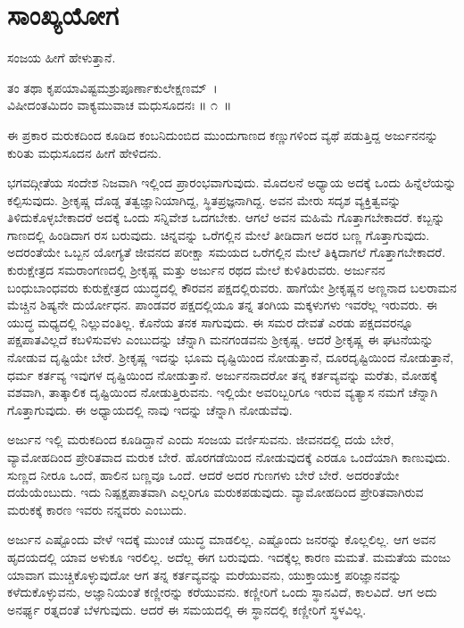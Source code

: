 
\chapter{ಸಾಂಖ್ಯಯೋಗ}

ಸಂಜಯ ಹೀಗೆ ಹೇಳುತ್ತಾನೆ.

\begin{shloka}
ತಂ ತಥಾ ಕೃಪಯಾವಿಷ್ಟಮಶ್ರುಪೂರ್ಣಾಕುಲೇಕ್ಷಣಮ್~।\\ವಿಷೀದಂತಮಿದಂ ವಾಕ್ಯಮುವಾಚ ಮಧುಸೂದನಃ \hfill॥ ೧~॥
\end{shloka}

\begin{artha}
ಈ ಪ್ರಕಾರ ಮರುಕದಿಂದ ಕೂಡಿದ ಕಂಬನಿದುಂಬಿದ ಮುಂದುಗಾಣದ ಕಣ್ಣುಗಳಿಂದ ವ್ಯಥೆ ಪಡುತ್ತಿದ್ದ ಅರ್ಜುನನನ್ನು ಕುರಿತು ಮಧುಸೂದನ ಹೀಗೆ ಹೇಳಿದನು.
\end{artha}

ಭಗವದ್ಗೀತೆಯ ಸಂದೇಶ ನಿಜವಾಗಿ ಇಲ್ಲಿಂದ ಪ್ರಾರಂಭವಾಗುವುದು. ಮೊದಲನೆ ಅಧ್ಯಾಯ ಅದಕ್ಕೆ ಒಂದು ಹಿನ್ನೆಲೆಯನ್ನು ಕಲ್ಪಿಸುವುದು. ಶ‍್ರೀಕೃಷ್ಣ ದೊಡ್ಡ ತತ್ವಜ್ಞಾನಿಯಾಗಿದ್ದ, ಸ್ಥಿತಪ್ರಜ್ಞ\-ನಾಗಿದ್ದ. ಅವನ ಮೇರು ಸದೃಶ ವ್ಯಕ್ತಿತ್ವವನ್ನು ತಿಳಿದುಕೊಳ್ಳಬೇಕಾದರೆ ಅದಕ್ಕೆ ಒಂದು ಸನ್ನಿವೇಶ ಒದಗಬೇಕು. ಆಗಲೆ ಅವನ ಮಹಿಮೆ ಗೊತ್ತಾಗಬೇಕಾದರೆ. ಕಬ್ಬನ್ನು ಗಾಣದಲ್ಲಿ ಹಿಂಡಿದಾಗ ರಸ ಬರುವುದು. ಚಿನ್ನವನ್ನು ಒರೆಗಲ್ಲಿನ ಮೇಲೆ ತೀಡಿದಾಗ ಅದರ ಬಣ್ಣ ಗೊತ್ತಾಗುವುದು. ಅದರಂತೆಯೇ ಒಬ್ಬನ ಯೋಗ್ಯತೆ ಜೀವನದ ಪರೀಕ್ಷಾ ಸಮಯದ ಒರೆಗಲ್ಲಿನ ಮೇಲೆ ತಿಕ್ಕಿದಾಗಲೆ ಗೊತ್ತಾಗಬೇಕಾದರೆ. ಕುರುಕ್ಷೇತ್ರದ ಸಮರಾಂಗಣದಲ್ಲಿ ಶ‍್ರೀಕೃಷ್ಣ ಮತ್ತು ಅರ್ಜುನ ರಥದ ಮೇಲೆ ಕುಳಿತಿರುವರು. ಅರ್ಜುನನ ಬಂಧುಬಾಂಧವರು ಕುರುಕ್ಷೇತ್ರದ ಯುದ್ಧದಲ್ಲಿ ಕೌರವನ ಪಕ್ಷದಲ್ಲಿರುವರು. ಹಾಗೆಯೇ ಶ‍್ರೀಕೃಷ್ಣನ ಅಣ್ಣನಾದ ಬಲರಾಮನ ಮೆಚ್ಚಿನ ಶಿಷ್ಯನೇ ದುರ್ಯೋಧನ. ಪಾಂಡವರ ಪಕ್ಷದಲ್ಲಿಯೂ ತನ್ನ ತಂಗಿಯ ಮಕ್ಕಳುಗಳು ಇವರೆಲ್ಲ ಇರುವರು. ಈ ಯುದ್ಧ ಮಧ್ಯದಲ್ಲಿ ನಿಲ್ಲುವಂತಿಲ್ಲ. ಕೊನೆಯ ತನಕ ಸಾಗುವುದು. ಈ ಸಮರ ದೇವತೆ ಎರಡು ಪಕ್ಷದವರನ್ನೂ ಪಕ್ಷಪಾತವಿಲ್ಲದೆ ಕಬಳಿಸುವಳು ಎಂಬುದನ್ನು ಚೆನ್ನಾಗಿ ಮನಗಂಡವನು ಶ‍್ರೀಕೃಷ್ಣ. ಆದರೆ ಶ‍್ರೀಕೃಷ್ಣ ಈ ಘಟನೆಯನ್ನು ನೋಡುವ ದೃಷ್ಟಿಯೇ ಬೇರೆ. ಶ‍್ರೀಕೃಷ್ಣ ಇದನ್ನು ಭೂಮ ದೃಷ್ಟಿಯಿಂದ ನೋಡುತ್ತಾನೆ, ದೂರದೃಷ್ಟಿಯಿಂದ ನೋಡುತ್ತಾನೆ, ಧರ್ಮ ಕರ್ತವ್ಯ ಇವುಗಳ ದೃಷ್ಟಿಯಿಂದ ನೋಡುತ್ತಾನೆ. ಅರ್ಜುನನಾದರೋ ತನ್ನ ಕರ್ತವ್ಯವನ್ನು ಮರೆತು, ಮೋಹಕ್ಕೆ ವಶವಾಗಿ, ತಾತ್ಕಾಲಿಕ ದೃಷ್ಟಿಯಿಂದ ನೋಡುತ್ತಿರುವನು. ಇಲ್ಲಿಯೇ ಅವರಿಬ್ಬರಿಗೂ ಇರುವ ವ್ಯತ್ಯಾಸ ನಮಗೆ ಚೆನ್ನಾಗಿ ಗೊತ್ತಾಗುವುದು. ಈ ಅಧ್ಯಾಯದಲ್ಲಿ ನಾವು ಇದನ್ನು ಚೆನ್ನಾಗಿ ನೋಡುವೆವು.

ಅರ್ಜುನ ಇಲ್ಲಿ ಮರುಕದಿಂದ ಕೂಡಿದ್ದಾನೆ ಎಂದು ಸಂಜಯ ವರ್ಣಿಸುವನು. ಜೀವನದಲ್ಲಿ ದಯೆ ಬೇರೆ, ವ್ಯಾಮೋಹದಿಂದ ಪ್ರೇರಿತವಾದ ಮರುಕ ಬೇರೆ. ಹೊರಗಡೆಯಿಂದ ನೋಡುವುದಕ್ಕೆ ಎರಡೂ ಒಂದೆಯಾಗಿ ಕಾಣುವುದು. ಸುಣ್ಣದ ನೀರೂ ಒಂದೆ, ಹಾಲಿನ ಬಣ್ಣವೂ ಒಂದೆ. ಆದರೆ ಅದರ ಗುಣಗಳು ಬೇರೆ ಬೇರೆ. ಅದರಂತೆಯೇ ದಯೆಯೆಂಬುದು. ಇದು ನಿಷ್ಪಕ್ಷಪಾತವಾಗಿ ಎಲ್ಲರಿಗೂ ಮರುಕಪಡುವುದು. ವ್ಯಾಮೋಹದಿಂದ ಪ್ರೇರಿತವಾಗಿರುವ ಮರುಕಕ್ಕೆ ಕಾರಣ ಇವರು ನನ್ನವರು ಎಂಬುದು.

ಅರ್ಜುನ ಎಷ್ಟೊಂದು ವೇಳೆ ಇದಕ್ಕೆ ಮುಂಚೆ ಯುದ್ಧ ಮಾಡಲಿಲ್ಲ. ಎಷ್ಟೊಂದು ಜನರನ್ನು ಕೊಲ್ಲಲಿಲ್ಲ. ಆಗ ಅವನ ಹೃದಯದಲ್ಲಿ ಯಾವ ಅಳುಕೂ ಇರಲಿಲ್ಲ. ಅದೆಲ್ಲ ಈಗ ಬರುವುದು. ಇದಕ್ಕೆಲ್ಲ ಕಾರಣ ಮಮತೆ. ಮಮತೆಯ ಮಂಜು ಯಾವಾಗ ಮುಚ್ಚಿಕೊಳ್ಳುವುದೋ ಆಗ ತನ್ನ ಕರ್ತವ್ಯವನ್ನು ಮರೆಯುವನು, ಯುಕ್ತಾಯುಕ್ತ ಪರಿಜ್ಞಾನವನ್ನು ಕಳೆದುಕೊಳ್ಳುವನು, ಅಜ್ಞಾನಿಯಂತೆ ಕಣ್ಣೀರನ್ನು ಕರೆಯುವನು. ಕಣ್ಣೀರಿಗೆ ಒಂದು ಸ್ಥಾನವಿದೆ, ಕಾಲವಿದೆ. ಆಗ ಅದು ಅನರ್ಘ್ಯ ರತ್ನದಂತೆ ಬೆಳಗುವುದು. ಆದರೆ ಈ ಸಮಯದಲ್ಲಿ ಈ ಸ್ಥಾನದಲ್ಲಿ ಕಣ್ಣೀರಿಗೆ ಸ್ಥಳವಿಲ್ಲ.

